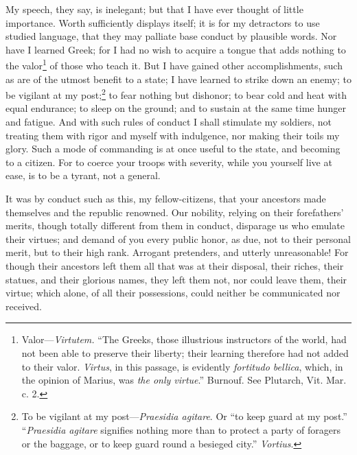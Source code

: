 My speech, they say, is inelegant; but that I have ever thought of
little importance. Worth sufficiently displays itself; it is for my
detractors to use studied language, that they may palliate base
conduct by plausible words. Nor have I learned Greek; for I had no
wish to acquire a tongue that adds nothing to the valor\footnote{Valor—\emph{Virtutem.} ``The Greeks, those illustrious instructors
of the world, had not been able to preserve their liberty; their
learning therefore had not added to their valor. \emph{Virtus}, in this
passage, is evidently \emph{fortitudo bellica}, which, in the opinion of
Marius, was \emph{the only virtue}.'' Burnouf. See Plutarch, Vit. Mar. c. 2.} of those
who teach it. But I have gained other accomplishments, such as are of
the utmost benefit to a state; I have learned to strike down an enemy;
to be vigilant at my post;\footnote{To be vigilant at my post—\emph{Praesidia agitare}. Or ``to keep
guard at my post.'' ``\emph{Praesidia agitare} signifies nothing more than to
protect a party of foragers or the baggage, or to keep guard round a
besieged city.'' \emph{Vortius}.} to fear nothing but dishonor; to bear
cold and heat with equal endurance; to sleep on the ground; and to
sustain at the same time hunger and fatigue. And with such rules of
conduct I shall stimulate my soldiers, not treating them with rigor
and myself with indulgence, nor making their toils my glory. Such a
mode of commanding is at once useful to the state, and becoming to a
citizen. For to coerce your troops with severity, while you yourself
live at ease, is to be a tyrant, not a general.

It was by conduct such as this, my fellow-citizens, that your
ancestors made themselves and the republic renowned. Our nobility,
relying on their forefathers' merits, though totally different from
them in conduct, disparage us who emulate their virtues; and demand of
you every public honor, as due, not to their personal merit, but to
their high rank. Arrogant pretenders, and utterly unreasonable! For
though their ancestors left them all that was at their disposal, their
riches, their statues, and their glorious names, they left them not,
nor could leave them, their virtue; which alone, of all their
possessions, could neither be communicated nor received.

